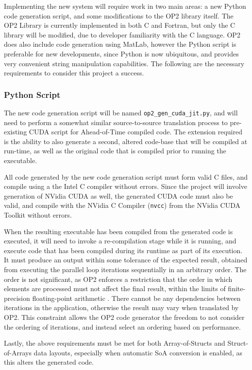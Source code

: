 Implementing the new system will require work in two main areas: a new Python code generation script, and some modifications to the OP2 library itself. The OP2 Library is currently implemented in both C and Fortran, but only the C library will be modified, due to developer familiarity with the C language. OP2 does also include code generation using MatLab, however the Python script is preferable for new developments, since Python is now ubiquitous, and provides very convenient string manipulation capabilities. The following are the necessary requirements to consider this project a success.

\subsubsection{Python Script}
The new code generation script will be named \verb|op2_gen_cuda_jit.py|, and will need to perform a somewhat similar source-to-source translation process to pre-existing CUDA script for Ahead-of-Time compiled code. The extension required is the ability to also generate a second, altered code-base that will be compiled at run-time, as well as the original code that is compiled prior to running the executable.
\par
All code generated by the new code generation script must form valid C files, and compile using a the Intel C compiler \cite{icc} without errors. Since the project will involve generation of NVidia CUDA as well, the generated CUDA code must also be valid, and compile with the NVidia C Compiler (\verb|nvcc|) from the NVidia CUDA Toolkit \cite{nvcc,toolkit} without errors.
\par
When the resulting executable has been compiled from the generated code is executed, it will need to invoke a re-compilation stage while it is running, and execute code that has been compiled during its runtime as part of its execution. It must produce an output within some tolerance of the expected result, obtained from executing the parallel loop iterations sequentially in an arbitrary order. The order is not significant, as OP2 enforces a restriction that the order in which elements are processed must not affect the final result, within the limits of finite-precision floating-point arithmetic \cite[p3]{op2main}. There cannot be any dependencies between iterations in the application, otherwise the result may vary when translated by OP2. This constraint allows the OP2 code generator the freedom to not consider the ordering of iterations, and instead select an ordering based on performance.
\par
Lastly, the above requirements must be met for both Array-of-Structs and Struct-of-Arrays data layouts, especially when automatic SoA conversion is enabled, as this alters the generated code.

